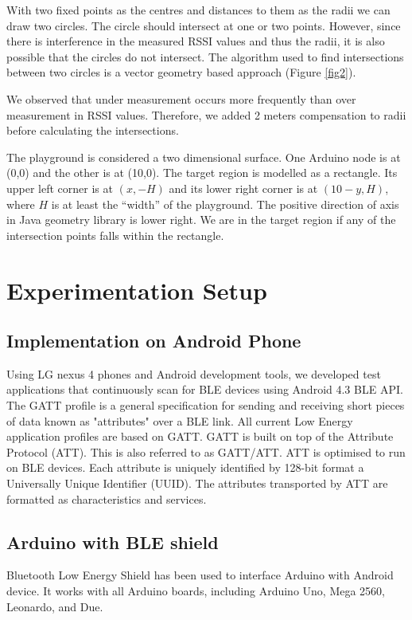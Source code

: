 \documentclass[conference,a4paper]{../../sty/IEEEtran}
\begin{document}
With two fixed points as the centres and distances to them as the radii we can draw two circles.
The circle should intersect at one or two points.
However, since there is interference in the measured RSSI values and thus the radii, it is also possible that the circles do not intersect.
The algorithm used to find intersections between two circles is a vector geometry based approach (Figure \ref{fig2})\cite{cshint}.

We observed that under measurement occurs more frequently than over measurement in RSSI values.
Therefore, we added 2 meters compensation to radii before calculating the intersections.

The playground is considered a two dimensional surface.
One Arduino node is at (0,0) and the other is at (10,0).
The target region is modelled as a rectangle.
Its upper left corner is at $(x, -H)$ and its lower right corner is at $(10-y, H)$, where $H$ is at least the ``width'' of the playground.
The positive direction of axis in Java geometry library is lower right.
We are in the target region if any of the intersection points falls within the rectangle.

\section{Experimentation Setup}

\subsection{Implementation on Android Phone}

Using LG nexus 4 phones and Android development tools, we developed test applications that continuously scan for BLE devices using Android 4.3 BLE API. The GATT profile is a general specification for sending and receiving short pieces of data known as "attributes" over a BLE link. All current Low Energy application profiles are based on GATT. GATT is built on top of the Attribute Protocol (ATT). This is also referred to as GATT/ATT. ATT is optimised to run on BLE devices. Each attribute is uniquely identified by 128-bit format a Universally Unique Identifier (UUID). The attributes transported by ATT are formatted as characteristics and services.

\subsection{Arduino with BLE shield}

Bluetooth Low Energy Shield has been used to interface Arduino with Android device. It works with all Arduino boards, including Arduino Uno, Mega 2560, Leonardo, and Due. 
\end{document}
